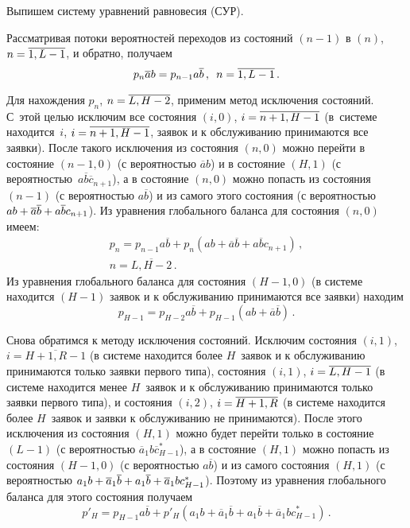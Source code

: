 \begin{multicols}{2}
Выпишем систему уравнений равновесия (СУР).

Рассматривая потоки вероятностей переходов из
состояний $(n-1)$ в
$(n)$, $n\hm=\overline{1,L-1}$, и обратно, получаем
\begin{equation}
\label{4.1}
p_{n} \overline{a} b = p_{n-1} a \overline{b} \,,
\enskip n=\overline{1,L-1}\,.
\end{equation}

Для нахождения $p_{n}$, $n\hm=\overline{L,H-2}$,
применим метод исключения состояний.
С~этой целью исключим все состояния
$(i,0)$, ${i\hm=\overline{n+1,H-1}}$ (в~сис\-те\-ме
находится~$i$, ${i\hm=\overline{n+1,H-1}}$, заявок
и к обслуживанию принимаются все заявки).
После такого исключения из состояния $(n,0)$ можно
перейти в состояние $(n-1,0)$ (с
вероятностью $\overline{a} b$) и в состояние $(H,1)$
(с вероятностью~$a \overline{b} \overline{c}_{n+1}$), а в
состояние $(n,0)$ можно попасть из состояния $(n-1)$
(с вероятностью $a\overline{b}$) и из самого этого состояния
(с вероятностью $a b \hm+ \overline{a} \overline{b}\hm + a \overline{b} c_{n+1}$).
Из уравнения глобального баланса для
состояния $(n,0)$ имеем:
\begin{multline}
\label{4.2}
p_{n}= p_{n-1} a \overline{b} + p_{n} (a b + \overline{a} \overline{b} +
 a \overline{b} c_{n+1}) \,,
\\ n=\overline{L,H-2}\,.
\end{multline}
Из уравнения глобального баланса для со\-сто\-яния $(H-1,0)$
(в системе находится $(H-1)$ заявок и к обслуживанию принимаются
все заявки) находим
\begin{equation}
\label{4.3}
p_{H-1} = p_{H-2} a \overline{b} + p_{H-1} (a b + \overline{a} \overline{b}) \,.
\end{equation}

Снова обратимся к методу исключения состояний.
Исключим состояния $(i,1)$, ${i=\overline{H+1,R-1}}$
(в системе находится более $H$~заявок и к
обслуживанию принимаются только заявки первого
типа), состояния $(i,1)$, $i\hm=\overline{L,H-1}$
(в системе находится менее $H$~заявок и к
обслуживанию принимаются только заявки первого
типа), и состояния $(i,2)$, $i\hm=\overline{H+1,R}$
(в системе находится более $H$~заявок и заявки к
обслуживанию не принимаются).
После этого исключения из состояния $(H,1)$ можно
будет перейти только в состояние $(L-1)$ (с вероятностью
$\overline{a}_1 b \overline{c}^*_{H-1}$),
а в состояние $(H,1)$ можно попасть из
состояния $(H-1,0)$ (с вероятностью $a \overline{b}$)
и из самого состояния $(H,1)$ (с вероятностью
$a_1 b \hm+ \overline{a}_1 \overline{b}\hm + a_1 \overline{b} +
\overline{a}_1 b c^*_{H-1}$).
Поэтому из уравнения глобального баланса для этого состояния получаем
\begin{equation}
\label{4.4}
p'_{H} = p_{H-1} a \overline{b} + p'_{H} (a_1 b + \overline{a}_1 \overline{b}
+ a_1 \overline{b} + \overline{a}_1 b c^*_{H-1})\,.
\end{equation}


\end{multicols}
